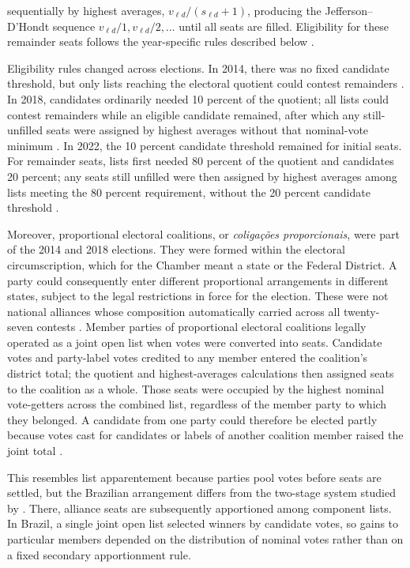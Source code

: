\documentclass[11pt]{article}
\begin{document}
sequentially by highest averages,
$v_{\ell d}/(s_{\ell d}+1)$, producing the Jefferson--D'Hondt sequence
$v_{\ell d}/1,v_{\ell d}/2,\ldots$ until all seats are filled. Eligibility for
these remainder seats follows the year-specific rules described below
\parencite[art.~109]{codigoEleitoral1965,nicolauSchmitt1995}. 

Eligibility rules changed across elections. In 2014, there was no fixed
candidate threshold, but only lists reaching the electoral quotient could contest
remainders \parencite[art.~186, \S 2]{tse2013res23399}. In 2018, candidates
ordinarily needed 10 percent of the quotient; all lists could contest remainders
while an eligible candidate remained, after which any still-unfilled seats were
assigned by highest averages without that nominal-vote minimum
\parencite[arts.~7--10]{tse2017res23554}. In 2022, the 10 percent candidate
threshold remained for initial seats. For remainder seats, lists first needed
80 percent of the quotient and candidates 20 percent; any seats still unfilled
were then assigned by highest averages among lists meeting the 80 percent
requirement, without the 20 percent candidate threshold
\parencite[arts.~8--11]{tse2021res23677}.

Moreover, proportional electoral coalitions, or \emph{coligações proporcionais}, were
part of the 2014 and 2018 elections. They were formed within the electoral
circumscription, which for the Chamber meant a state or the Federal District. A
party could consequently enter different proportional arrangements in different
states, subject to the legal restrictions in force for the election. These were
not national alliances whose composition automatically carried across all
twenty-seven contests \parencite{nicolau2006openlist,tse2013res23399,tse2017res23554}. Member parties of proportional electoral coalitions legally operated as a
joint open list when votes were converted into seats.
Candidate votes and party-label votes credited to any member entered the
coalition's district total; the quotient and highest-averages calculations then
assigned seats to the coalition as a whole. Those seats were occupied by the
highest nominal vote-getters across the combined list, regardless of the member
party to which they belonged. A candidate from one party could therefore be
elected partly because votes cast for candidates or labels of another coalition
member raised the joint total \parencite{nicolau2006openlist,tse2013res23399,tse2017res23554}. 

This resembles list apparentement because parties pool votes before seats are
settled, but the Brazilian arrangement differs from the two-stage system studied
by \textcite{pukelsheimLeutgaeb2013apparentements}. There, alliance seats are
subsequently apportioned among component lists. In Brazil, a single joint open
list selected winners by candidate votes, so gains to particular members depended
on the distribution of nominal votes rather than on a fixed secondary
apportionment rule.
\end{document}
